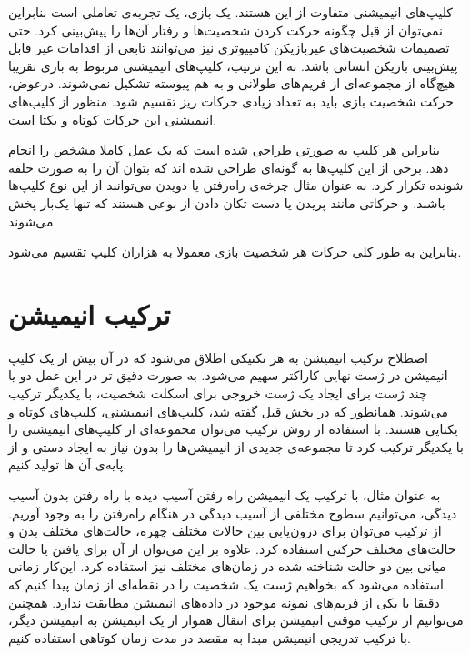 کلیپ‌های انیمیشنی متفاوت از این هستند. یک بازی، یک تجربه‌ی تعاملی است بنابراین نمی‌توان از قبل چگونه حرکت کردن شخصیت‌ها و رفتار آن‌ها را پیش‌بینی کرد.
حتی تصمیمات شخصیت‌های غیربازیکن کامپیوتری نیز می‌توانند تابعی از اقدامات غیر قابل پیش‌بینی بازیکن انسانی باشد.
به این ترتیب، کلیپ‌های انیمیشنی مربوط به بازی تقریبا هیچ‌گاه از مجموعه‌ای از فریم‌های طولانی و به هم پیوسته تشکیل نمی‌شوند.
درعوض، حرکت شخصیت بازی باید به تعداد زیادی حرکات ریز تقسیم شود. 
منظور از کلیپ‌های انیمیشنی این حرکات کوتاه و یکتا است.

بنابراین هر کلیپ به صورتی طراحی شده است که یک عمل کاملا مشخص را انجام دهد. برخی از این کلیپ‌ها به گونه‌ای طراحی شده اند که بتوان آن را به صورت حلقه شونده تکرار کرد.
به عنوان مثال چرخه‌ی راه‌رفتن یا دویدن می‌توانند از این نوع کلیپ‌ها باشند.
و حرکاتی مانند پریدن یا دست تکان دادن از نوعی هستند که تنها یک‌بار پخش می‌شوند.

بنابراین به طور کلی حرکات هر شخصیت بازی معمولا به هزاران کلیپ تقسیم می‌شود. \cite{GameEngineArchitecture}

\section{ترکیب انیمیشن}

اصطلاح ترکیب انیمیشن به هر تکنیکی اطلاق می‌شود که در آن بیش از یک کلیپ انیمیشن در ژست نهایی کاراکتر سهیم می‌شود.
به صورت دقیق تر در این عمل دو یا چند ژست برای ایجاد یک ژست خروجی برای اسکلت شخصیت، با یکدیگر ترکیب می‌شوند.
همانطور که در بخش قبل گفته شد، کلیپ‌های انیمیشنی، کلیپ‌های کوتاه و یکتایی هستند. با استفاده از روش ترکیب ‌می‌توان مجموعه‌ای از کلیپ‌های انیمیشنی را با یکدیگر ترکیب کرد تا مجموعه‌ی جدیدی از انیمیشن‌ها را بدون نیاز به ایجاد دستی و از پایه‌ی آن ها تولید کنیم.

به عنوان مثال، با ترکیب یک انیمیشن راه رفتن آسیب دیده با راه رفتن بدون آسیب دیدگی، می‌توانیم سطوح مختلفی از آسیب دیدگی در هنگام راه‌رفتن را به وجود آوریم.
از ترکیب می‌توان برای درون‌یابی بین حالات مختلف چهره، حالت‌های مختلف بدن و حالت‌های مختلف حرکتی استفاده کرد.
علاوه بر این می‌توان از آن برای یافتن یا حالت میانی بین دو حالت شناخته شده در زمان‌های مختلف نیز استفاده کرد. این‌کار زمانی استفاده می‌شود که بخواهیم ژست یک شخصیت را در نقطه‌ای از زمان پیدا کنیم که دقیقا با یکی از فریم‌های نمونه موجود در داده‌های انیمیشن مطابقت ندارد.
همچنین می‌توانیم از ترکیب موقتی انیمیشن برای انتقال هموار از یک انیمیشن به انیمیشن دیگر، با ترکیب تدریجی انیمیشن مبدا به مقصد در مدت زمان کوتاهی استفاده کنیم.